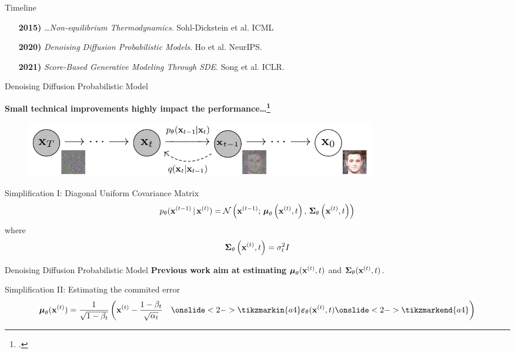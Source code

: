 \documentclass[aspectratio=169, 10pt]{beamer}
\theoremstyle{definition}
\begin{document}
\begin{frame}{Timeline}
\begin{enumerate}
  \item[\bf 2015)] \textit{\ldots Non-equilibrium
  Thermodynamics}. Sohl-Dickstein et al. ICML\hfill {\color{ggreen} \checkmark}\vfill
  \item[\bf 2020)] \textit{Denoising Diffusion Probabilistic Models}.
  Ho et al. NeurIPS.\vfill
  \item[\bf 2021)] \textit{Score-Based Generative Modeling Through SDE}. Song et
    al. ICLR.
\end{enumerate}
\end{frame}
\begin{frame}{Denoising Diffusion Probabilistic Model}
  \begin{center}
    \bf 
    Small technical improvements highly impact the
    performance\ldots\footcite{ho}
  \end{center}
  \begin{figure}[h]
    \centering
    \includegraphics[width=0.75\textwidth]{./pic/ho_diffusion.png}
  \end{figure}
  \begin{block}{Simplification I: Diagonal Uniform Covariance
    Matrix}
    \[
      p_\theta({\mathbf{x}}^{(t-1)}\,\vert\,{\mathbf{x}}^{(t)}) = \mathcal{N}\left({\mathbf{x}}^{(t-1)};\, 
        {\boldsymbol{\mu}}_\theta\left(
        {\mathbf{x}}^{(t)},t \right),\, {\boldsymbol{\Sigma}}_\theta\left({\mathbf{x}}^{(t)},t \right)\right)
    \]
    where
    \[
      {\boldsymbol{\Sigma}}_\theta\left( {\mathbf{x}}^{(t)},t  \right)= \sigma_t^2 I
    \]
  \end{block}
  \vfill
\end{frame}
\begin{frame}{Denoising Diffusion Probabilistic Model}
  \textbf{Previous work aim at estimating}
  \(
    {\boldsymbol{\mu}}_\theta({\mathbf{x}}^{(t)},t)
  \) and
  \(
    {\boldsymbol{\Sigma}}_\theta({\mathbf{x}}^{(t)},t)
    \).
    \begin{block}{Simplification II: Estimating the commited error}
      \[
        \mub_\theta(\xx^{(t)})= \frac{1}{\sqrt{1-\beta_t}}\left( \xx^{(t)} -
          \frac{1-\beta_t}{\sqrt{\alpha_t}}\quad\onslide<2->{\tikzmarkin{a4}}\varepsilonb_\theta(\xx^{(t)},t)\onslide<2->{\tikzmarkend{a4}}
      \right)
      \]
    \end{block}
      \vfill
\end{frame}
\end{document}
